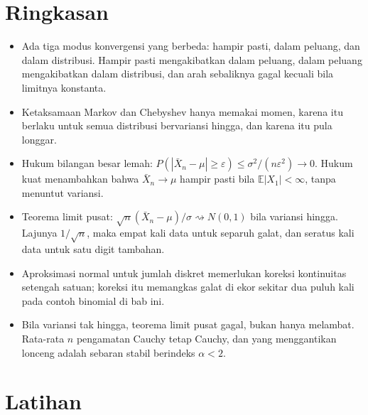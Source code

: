 \section{Ringkasan}

\begin{ringkasan}
\begin{itemize}
  \item Ada tiga modus konvergensi yang berbeda: hampir pasti, dalam peluang, dan
        dalam distribusi. Hampir pasti mengakibatkan dalam peluang, dalam peluang
        mengakibatkan dalam distribusi, dan arah sebaliknya gagal kecuali bila
        limitnya konstanta.
  \item Ketaksamaan Markov dan Chebyshev hanya memakai momen, karena itu berlaku
        untuk semua distribusi bervariansi hingga, dan karena itu pula longgar.
  \item Hukum bilangan besar lemah: $P(|\bar X_n-\mu|\ge\varepsilon)\le
        \sigma^2/(n\varepsilon^2)\to0$. Hukum kuat menambahkan bahwa
        $\bar X_n\to\mu$ hampir pasti bila $\mathbb{E}|X_1|<\infty$, tanpa
        menuntut variansi.
  \item Teorema limit pusat: $\sqrt n(\bar X_n-\mu)/\sigma\rightsquigarrow N(0,1)$
        bila variansi hingga. Lajunya $1/\sqrt n$, maka empat kali data untuk
        separuh galat, dan seratus kali data untuk satu digit tambahan.
  \item Aproksimasi normal untuk jumlah diskret memerlukan koreksi kontinuitas
        setengah satuan; koreksi itu memangkas galat di ekor sekitar dua puluh
        kali pada contoh binomial di bab ini.
  \item Bila variansi tak hingga, teorema limit pusat gagal, bukan hanya melambat.
        Rata-rata $n$ pengamatan Cauchy tetap Cauchy, dan yang menggantikan
        lonceng adalah sebaran stabil berindeks $\alpha<2$.
\end{itemize}
\end{ringkasan}

\section{Latihan}

